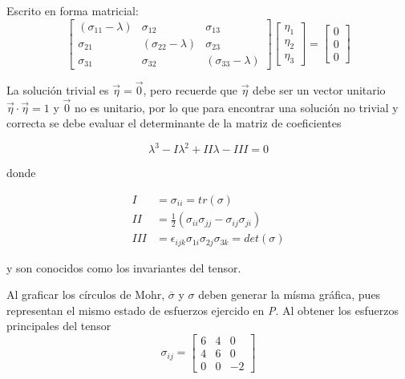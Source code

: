\documentclass{article}
\begin{document}
    Escrito en forma matricial:
    \begin{equation}
        \begin{bmatrix}
            (\sigma_{11} - \lambda) & \sigma_{12} & \sigma_{13}\\
            \sigma_{21} & (\sigma_{22} - \lambda) & \sigma_{23}\\
            \sigma_{31} & \sigma_{32} & (\sigma_{33} - \lambda)
        \end{bmatrix}
        \begin{bmatrix}
            \eta_{1}\\
            \eta_{2}\\
            \eta_{3}
        \end{bmatrix}
        =
        \begin{bmatrix}
            0\\
            0\\
            0
        \end{bmatrix}
    \end{equation}

    La soluci\'{o}n trivial es $\vec{\eta} = \vec{0}$, pero recuerde que $\vec{\eta}$ debe ser 
    un vector unitario $\vec{\eta}\cdot\vec{\eta}=1$ y $\vec{0}$ no es unitario, por lo que
    para encontrar una soluci\'{o}n no trivial y correcta se debe evaluar el determinante de
    la matriz de coeficientes

    \begin{equation}
        \lambda^3 - I\lambda^2 + II\lambda - III = 0
    \end{equation}

    donde

    \begin{align}
        I &= \sigma_{ii} = tr(\sigma)\\
        II &= \frac{1}{2}(\sigma_{ii}\sigma_{jj} - \sigma_{ij}\sigma_{ji})\\
        III &= \epsilon_{ijk}\sigma_{1i}\sigma_{2j}\sigma_{3k} = det(\sigma)
    \end{align}

    y son conocidos como los invariantes del tensor.

    Al graficar los c\'{i}rculos de Mohr, $\overline{\sigma}$ y $\sigma$ deben generar
    la m\'{i}sma gr\'{a}fica, pues representan el mismo estado de esfuerzos ejercido
    en \textit{P}. Al obtener los esfuerzos principales del tensor
    \begin{equation*}
        \sigma_{ij} = 
        \begin{bmatrix}
            6 & 4 & 0\\
            4 & 6 & 0\\
            0 & 0 & -2
        \end{bmatrix}
    \end{equation*}
\end{document}

